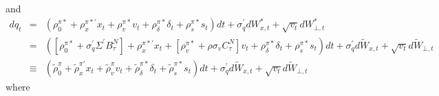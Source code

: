\documentclass{article}
\begin{document}
and%
\begin{eqnarray*}
dq_{t} &=&\left( \rho _{0}^{\pi \ast }+\rho _{x}^{\pi \ast \prime
}x_{t}+\rho _{v}^{\pi \ast }v_{t}+\rho _{\delta }^{\pi \ast }\delta
_{t}+\rho _{s}^{\pi \ast }s_{t}\right) dt+\sigma _{q}^{\prime
}dW_{x,t}^{\ast }+\sqrt{v_{t}}dW_{\bot ,t}^{\ast } \\
&=&\left( \left[ \rho _{0}^{\pi \ast }+\sigma _{q}^{\prime }\Sigma ^{\prime
}B_{\tau }^{N}\right] +\rho _{x}^{\pi \ast \prime }x_{t}+\left[ \rho
_{v}^{\pi \ast }+\rho \sigma _{v}C_{\tau }^{N}\right] v_{t}+\rho _{\delta
}^{\pi \ast }\delta _{t}+\rho _{s}^{\pi \ast }s_{t}\right) dt+\sigma
_{q}^{\prime }d\tilde{W}_{x,t}+\sqrt{v_{t}}d\tilde{W}_{\bot ,t} \\
&\equiv &\left( \widetilde{\rho }_{0}^{\pi }+\widetilde{\rho }_{x}^{\pi
\prime }x_{t}+\widetilde{\rho }_{v}^{\pi }v_{t}+\widetilde{\rho }_{\delta
}^{\pi \ast }\delta _{t}+\widetilde{\rho }_{s}^{\pi \ast }s_{t}\right)
dt+\sigma _{q}^{\prime }d\tilde{W}_{x,t}+\sqrt{v_{t}}d\tilde{W}_{\bot ,t}
\end{eqnarray*}%
where 
\end{document}
